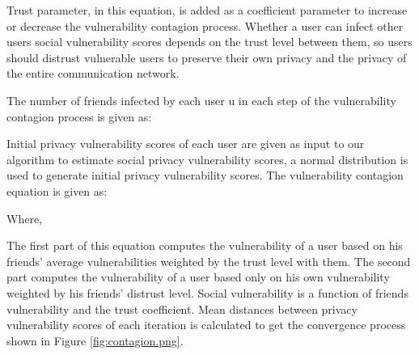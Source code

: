 
Trust parameter,
	in this equation,
	is added as a coefficient parameter to increase or decrease the vulnerability contagion process.
Whether a user can infect other users social vulnerability scores depends on the trust level between them,
	so users should distrust vulnerable users to preserve their own privacy and the privacy of the entire communication network.

The number of friends infected by each user u in each step of the vulnerability contagion process is given as:


Initial privacy vulnerability scores of each user are given as input to our algorithm to estimate social privacy vulnerability scores,
	a normal distribution is used to generate initial privacy vulnerability scores.
The vulnerability contagion equation is given as:


Where,

The first part of this equation computes the vulnerability of a user based on his friends' average vulnerabilities weighted by the trust level with them.
The second part computes the vulnerability of a user based only on his own vulnerability weighted by his friends' distrust level.
Social vulnerability is a function of friends vulnerability and the trust coefficient.
Mean distances between privacy vulnerability scores of each iteration is calculated to get the convergence process shown in Figure \ref{fig:contagion.png}.





